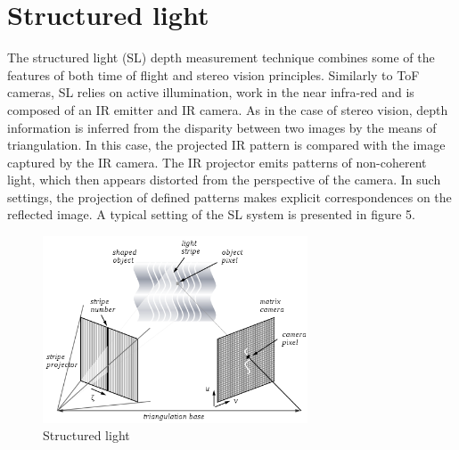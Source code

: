 \section{Structured light}
\label{sec:actuators}

The structured light (SL) depth measurement technique combines some of the features of both time of flight and stereo vision principles.  Similarly to ToF cameras, SL relies on active illumination, work in the near infra-red and is composed of an IR emitter and IR camera. As in the case of stereo vision, depth information is inferred from the disparity between two images by the means of triangulation. In this case, the projected IR pattern is compared with the image captured by the IR camera. The IR projector emits patterns of non-coherent light, which then appears distorted from the perspective of the camera. In such settings, the projection of defined patterns makes explicit correspondences on the reflected image. A typical setting of the SL system is presented in figure 5.

\begin{figure}[H]
\label{fig:sl}
\centering
\includegraphics[width=0.7\textwidth]{fig/structuredlight}
\caption{Structured light}
\end{figure}

